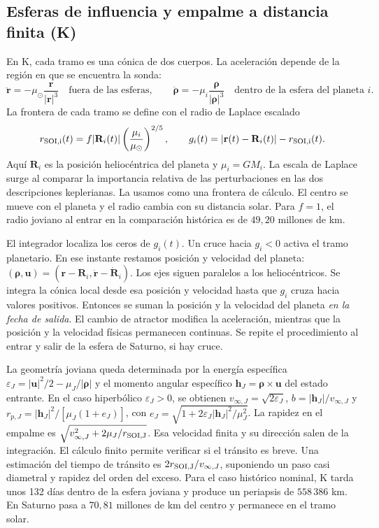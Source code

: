\documentclass[11pt,letterpaper]{article}
\newcommand{\vect}[1]{\mathbf{#1}}
\begin{document}
\subsection{Esferas de influencia y empalme a distancia finita (K)}
En K, cada tramo es una cónica de dos cuerpos. La aceleración depende de la región en que se encuentra la sonda:
\[
\ddot{\vect r}=-\mu_\odot\frac{\vect r}{|\vect r|^3}
\quad\text{fuera de las esferas},\qquad
\ddot{\vect\rho}=-\mu_i\frac{\vect\rho}{|\vect\rho|^3}
\quad\text{dentro de la esfera del planeta }i.
\]
La frontera de cada tramo se define con el radio de Laplace escalado
\begin{equation}
r_{\rm SOI,i}(t)=f|\vect R_i(t)|\left(\frac{\mu_i}{\mu_\odot}\right)^{2/5},
\qquad
g_i(t)=|\vect r(t)-\vect R_i(t)|-r_{\rm SOI,i}(t).
\end{equation} Aquí $\vect R_i$ es la posición heliocéntrica del planeta y $\mu_i=GM_i$. La escala de Laplace surge al comparar la importancia relativa de las perturbaciones en las dos descripciones keplerianas. La usamos como una frontera de cálculo. El centro se mueve con el planeta y el radio cambia con su distancia solar. Para $f=1$, el radio joviano al entrar en la comparación histórica es de $49{,}20$ millones de km.

El integrador localiza los ceros de $g_i(t)$. Un cruce hacia $g_i<0$ activa el tramo planetario. En ese instante restamos posición y velocidad del planeta: $(\vect\rho,\vect u)=(\vect r-\vect R_i,\dot{\vect r}-\dot{\vect R}_i)$. Los ejes siguen paralelos a los heliocéntricos. Se integra la cónica local desde esa posición y velocidad hasta que $g_i$ cruza hacia valores positivos. Entonces se suman la posición y la velocidad del planeta \emph{en la fecha de salida}. El cambio de atractor modifica la aceleración, mientras que la posición y la velocidad físicas permanecen continuas. Se repite el procedimiento al entrar y salir de la esfera de Saturno, si hay cruce.

La geometría joviana queda determinada por la energía específica $\varepsilon_J=|\vect u|^2/2-\mu_J/|\vect\rho|$ y el momento angular específico $\vect h_J=\vect\rho\times\vect u$ del estado entrante. En el caso hiperbólico $\varepsilon_J>0$, se obtienen $v_{\infty,J}=\sqrt{2\varepsilon_J}$, $b=|\vect h_J|/v_{\infty,J}$ y $r_{p,J}=|\vect h_J|^2/[\mu_J(1+e_J)]$, con $e_J=\sqrt{1+2\varepsilon_J|\vect h_J|^2/\mu_J^2}$. La rapidez en el empalme es $\sqrt{v_{\infty,J}^2+2\mu_J/r_{\rm SOI,J}}$. Esa velocidad finita y su dirección salen de la integración. El cálculo finito permite verificar si el tránsito es breve. Una estimación del tiempo de tránsito es $2r_{\rm SOI,J}/v_{\infty,J}$, suponiendo un paso casi diametral y rapidez del orden del exceso. Para el caso histórico nominal, K tarda unos 132 días dentro de la esfera joviana y produce un periapsis de $558\,386$ km. En Saturno pasa a $70{,}81$ millones de km del centro y permanece en el tramo solar.
\end{document}
